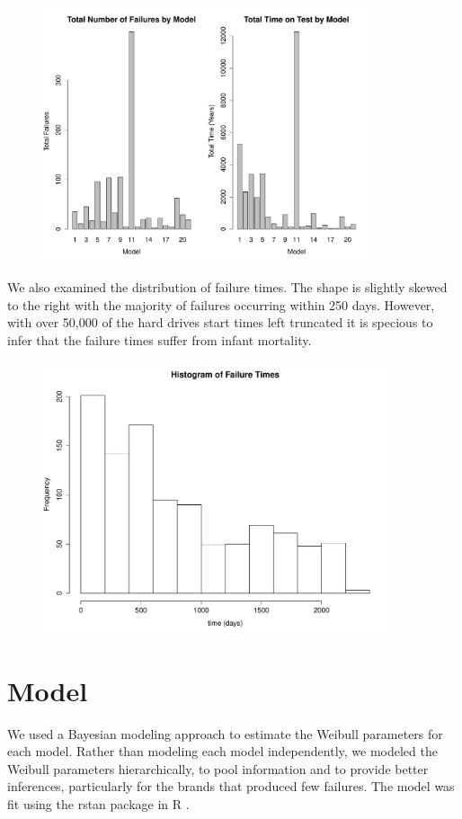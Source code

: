 \documentclass{scrartcl}
\begin{document}
\begin{figure}[H]
\centering
\includegraphics[height=7.5cm]{sumstat1.pdf}
\end{figure}
We also examined the distribution of failure times.  The shape is slightly skewed to the right with the majority of failures occurring within 250 days. However, with over 50,000 of the hard drives start times left truncated it is specious to infer that the failure times suffer from infant mortality.   
\begin{figure}[H]
\centering
\includegraphics[height=8cm]{failhist.pdf}
\end{figure}

\section*{Model}
We used a Bayesian modeling approach to estimate the Weibull parameters for each model. Rather than modeling each model independently, we modeled the Weibull parameters hierarchically, to pool information and to provide better inferences, particularly for the brands that produced few failures. The model was fit using the rstan package in R \cite{stan}.\\
\end{document}
